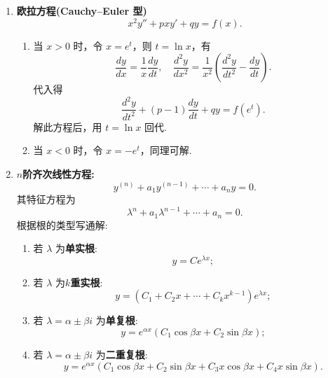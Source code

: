 \begin{enumerate}
    \item \textbf{欧拉方程(Cauchy–Euler 型)}
          \[
              x^2 y'' + p x y' + q y = f(x).
          \]
          \begin{enumerate}[label=(\roman*)]
              \item 当 $x>0$ 时，令 $x = e^t$，则 $t = \ln x$，有
                    \[
                        \frac{dy}{dx} = \frac{1}{x}\frac{dy}{dt},
                        \quad
                        \frac{d^2y}{dx^2}
                        = \frac{1}{x^2}\left( \frac{d^2y}{dt^2} - \frac{dy}{dt} \right).
                    \]
                    代入得
                    \[
                        \frac{d^2y}{dt^2} + (p - 1)\frac{dy}{dt} + qy = f(e^t).
                    \]
                    解此方程后，用 $t = \ln x$ 回代.
              \item 当 $x<0$ 时，令 $x = -e^t$，同理可解.
          \end{enumerate}

    \item \textbf{$n$阶齐次线性方程:}
          \[
              y^{(n)} + a_1 y^{(n-1)} + \cdots + a_n y = 0.
          \]
          其特征方程为
          \[
              \lambda^n + a_1 \lambda^{n-1} + \cdots + a_n = 0.
          \]
          根据根的类型写通解:
          \begin{enumerate}[label=(\roman*)]
              \item 若 $\lambda$ 为\textbf{单实根}:
                    \[
                        y = C e^{\lambda x};
                    \]
              \item 若 $\lambda$ 为\textbf{$k$重实根}:
                    \[
                        y = (C_1 + C_2 x + \cdots + C_k x^{k-1}) e^{\lambda x};
                    \]
              \item 若 $\lambda = \alpha \pm \beta i$ 为\textbf{单复根}:
                    \[
                        y = e^{\alpha x}(C_1 \cos \beta x + C_2 \sin \beta x);
                    \]
              \item 若 $\lambda = \alpha \pm \beta i$ 为\textbf{二重复根}:
                    \[
                        y = e^{\alpha x}(C_1 \cos \beta x + C_2 \sin \beta x
                        + C_3 x \cos \beta x + C_4 x \sin \beta x).
                    \]
          \end{enumerate}
\end{enumerate}

